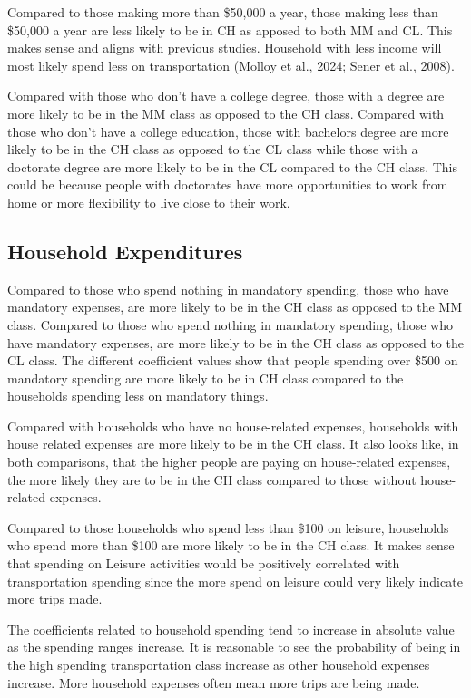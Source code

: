 \documentclass[
]{agujournal2019}
\begin{document}
Compared to those making more than \$50,000 a year, those making less
than \$50,000 a year are less likely to be in CH as apposed to both MM
and CL. This makes sense and aligns with previous studies. Household
with less income will most likely spend less on transportation (Molloy
et al., 2024; Sener et al., 2008).

Compared with those who don't have a college degree, those with a degree
are more likely to be in the MM class as opposed to the CH class.
Compared with those who don't have a college education, those with
bachelors degree are more likely to be in the CH class as opposed to the
CL class while those with a doctorate degree are more likely to be in
the CL compared to the CH class. This could be because people with
doctorates have more opportunities to work from home or more flexibility
to live close to their work.

\subsection{Household Expenditures}\label{household-expenditures}

Compared to those who spend nothing in mandatory spending, those who
have mandatory expenses, are more likely to be in the CH class as
opposed to the MM class. Compared to those who spend nothing in
mandatory spending, those who have mandatory expenses, are more likely
to be in the CH class as opposed to the CL class. The different
coefficient values show that people spending over \$500 on mandatory
spending are more likely to be in CH class compared to the households
spending less on mandatory things.

Compared with households who have no house-related expenses, households
with house related expenses are more likely to be in the CH class. It
also looks like, in both comparisons, that the higher people are paying
on house-related expenses, the more likely they are to be in the CH
class compared to those without house-related expenses.

Compared to those households who spend less than \$100 on leisure,
households who spend more than \$100 are more likely to be in the CH
class. It makes sense that spending on Leisure activities would be
positively correlated with transportation spending since the more spend
on leisure could very likely indicate more trips made.

The coefficients related to household spending tend to increase in
absolute value as the spending ranges increase. It is reasonable to see
the probability of being in the high spending transportation class
increase as other household expenses increase. More household expenses
often mean more trips are being made.
\end{document}
